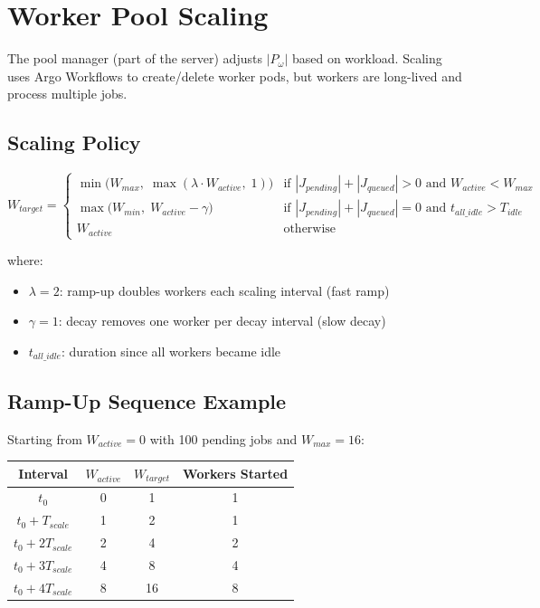 \documentclass[11pt]{article}
\begin{document}
\section{Worker Pool Scaling}
\label{sec:scaling}

The pool manager (part of the server) adjusts $|P_\omega|$ based on workload.
Scaling uses Argo Workflows to create/delete worker pods, but workers are long-lived
and process multiple jobs.

\subsection{Scaling Policy}

\begin{equation}
W_{target} = \begin{cases}
  \min\bigl(W_{max},\; \max(\lambda \cdot W_{active},\; 1)\bigr)
    & \text{if } |J_{pending}| + |J_{queued}| > 0 \text{ and } W_{active} < W_{max} \\[6pt]
  \max\bigl(W_{min},\; W_{active} - \gamma\bigr)
    & \text{if } |J_{pending}| + |J_{queued}| = 0 \text{ and } t_{all\_idle} > T_{idle} \\[6pt]
  W_{active}
    & \text{otherwise}
\end{cases}
\end{equation}

where:
\begin{itemize}
\item $\lambda = 2$: ramp-up doubles workers each scaling interval (fast ramp)
\item $\gamma = 1$: decay removes one worker per decay interval (slow decay)
\item $t_{all\_idle}$: duration since all workers became idle
\end{itemize}

\subsection{Ramp-Up Sequence Example}

Starting from $W_{active} = 0$ with 100 pending jobs and $W_{max} = 16$:

\begin{center}
\begin{tabular}{cccc}
\toprule
\textbf{Interval} & $W_{active}$ & $W_{target}$ & \textbf{Workers Started} \\
\midrule
$t_0$ & 0 & 1 & 1 \\
$t_0 + T_{scale}$ & 1 & 2 & 1 \\
$t_0 + 2T_{scale}$ & 2 & 4 & 2 \\
$t_0 + 3T_{scale}$ & 4 & 8 & 4 \\
$t_0 + 4T_{scale}$ & 8 & 16 & 8 \\
\bottomrule
\end{tabular}
\end{center}
\end{document}
